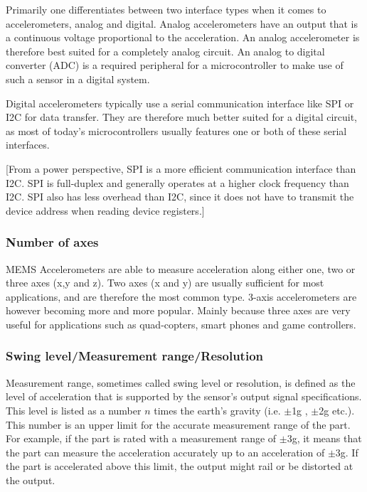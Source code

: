 Primarily one differentiates between two interface types when it comes to accelerometers, analog and digital. Analog accelerometers have an output that is a continuous voltage proportional to the acceleration. An analog accelerometer is therefore best suited for a completely analog circuit. An analog to digital converter (ADC) is a required peripheral for a microcontroller to make use of such a sensor in a digital system.

Digital accelerometers typically use a serial communication interface like SPI or I2C for data transfer. They are therefore much better suited for a digital circuit, as most of today's microcontrollers usually features one or both of these serial interfaces.

[From a power perspective, SPI is a more efficient communication interface than I2C. SPI is full-duplex and generally operates at a higher clock frequency than I2C. SPI also has less overhead than I2C, since it does not have to transmit the device address when reading device registers.] 

\subsubsection{Number of axes}
MEMS Accelerometers are able to measure acceleration along either one, two or three axes (x,y and z). Two axes (x and y) are usually sufficient for most applications, and are therefore the most common type. 3-axis accelerometers are however becoming more and more popular. Mainly because three axes are very useful for applications such as quad-copters, smart phones and game controllers.

\subsubsection{Swing level/Measurement range/Resolution}
Measurement range, sometimes called swing level or resolution, is defined as the level of acceleration that is supported by the sensor’s output signal specifications. This level is listed as a number $n$ times the earth’s gravity (i.e. $\pm$1g , $\pm$2g etc.). This number is an upper limit for the accurate measurement range of the part. For example, if the part is rated with a measurement range of $\pm$3g, it means that the part can measure the acceleration accurately up to an acceleration of $\pm$3g.  If the part is accelerated above this limit, the output might rail or be distorted at the output.

